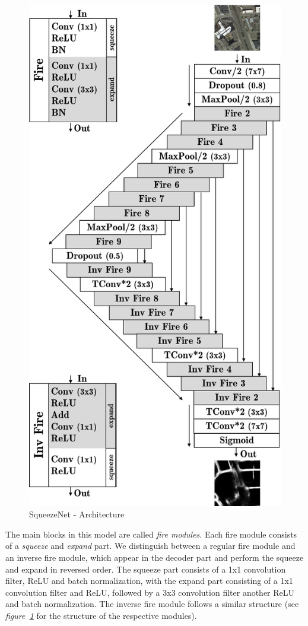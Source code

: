 \documentclass[10pt,conference,compsocconf]{IEEEtran}
\begin{document}
\begin{figure}[ht]
\centering
     \includegraphics[width=0.75\columnwidth]{images/squeeze.pdf}
     \captionsetup{justification=centering}
     \caption{SqueezeNet - Architecture}
     \label{fig:squeeze-arch}
\end{figure}

The main blocks in this model are called \textit{fire modules}. Each fire module consists of a \textit{squeeze} and \textit{expand} part. We distinguish between a regular fire module and an inverse fire module, which appear in the decoder part and perform the squeeze and expand in reversed order. The squeeze part consists of a 1x1 convolution filter, ReLU and batch normalization, with the expand part consisting of a 1x1 convolution filter and ReLU, followed by a 3x3 convolution filter another ReLU and batch normalization. The inverse fire module follows a similar structure (see \textit{figure~\ref{fig:squeeze-arch}} for the structure of the respective modules).
\end{document}
